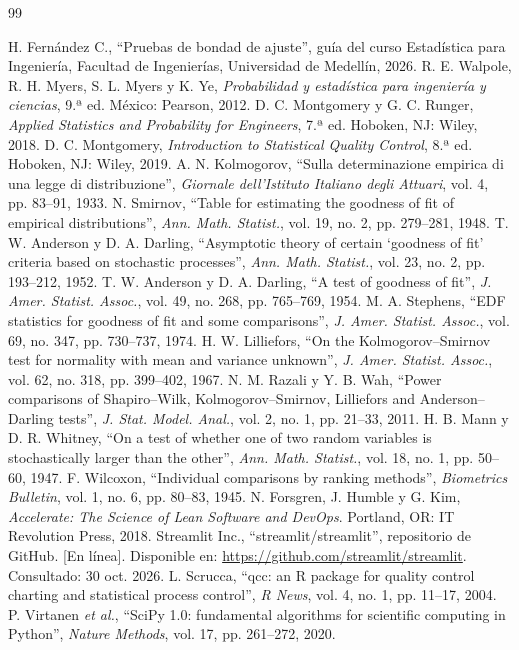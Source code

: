 \documentclass[11pt]{article}
\begin{document}
\begin{thebibliography}{99}\small
{}
 H. Fernández C., ``Pruebas de bondad de ajuste'', guía del curso Estadística para Ingeniería,
Facultad de Ingenierías, Universidad de Medellín, 2026.
 R. E. Walpole, R. H. Myers, S. L. Myers y K. Ye, \emph{Probabilidad y estadística para
ingeniería y ciencias}, 9.ª ed. México: Pearson, 2012.
 D. C. Montgomery y G. C. Runger, \emph{Applied Statistics and Probability for Engineers},
7.ª ed. Hoboken, NJ: Wiley, 2018.
 D. C. Montgomery, \emph{Introduction to Statistical Quality Control}, 8.ª ed. Hoboken, NJ:
Wiley, 2019.
 A. N. Kolmogorov, ``Sulla determinazione empirica di una legge di distribuzione'',
\emph{Giornale dell'Istituto Italiano degli Attuari}, vol. 4, pp. 83--91, 1933.
 N. Smirnov, ``Table for estimating the goodness of fit of empirical distributions'', \emph{Ann.
Math. Statist.}, vol. 19, no. 2, pp. 279--281, 1948.
 T. W. Anderson y D. A. Darling, ``Asymptotic theory of certain `goodness of fit' criteria based on
stochastic processes'', \emph{Ann. Math. Statist.}, vol. 23, no. 2, pp. 193--212, 1952.
 T. W. Anderson y D. A. Darling, ``A test of goodness of fit'', \emph{J. Amer. Statist. Assoc.},
vol. 49, no. 268, pp. 765--769, 1954.
 M. A. Stephens, ``EDF statistics for goodness of fit and some comparisons'', \emph{J. Amer.
Statist. Assoc.}, vol. 69, no. 347, pp. 730--737, 1974.
 H. W. Lilliefors, ``On the Kolmogorov--Smirnov test for normality with mean and variance
unknown'', \emph{J. Amer. Statist. Assoc.}, vol. 62, no. 318, pp. 399--402, 1967.
 N. M. Razali y Y. B. Wah, ``Power comparisons of Shapiro--Wilk, Kolmogorov--Smirnov, Lilliefors
and Anderson--Darling tests'', \emph{J. Stat. Model. Anal.}, vol. 2, no. 1, pp. 21--33, 2011.
 H. B. Mann y D. R. Whitney, ``On a test of whether one of two random variables is
stochastically larger than the other'', \emph{Ann. Math. Statist.}, vol. 18, no. 1, pp. 50--60, 1947.
 F. Wilcoxon, ``Individual comparisons by ranking methods'', \emph{Biometrics Bulletin}, vol. 1,
no. 6, pp. 80--83, 1945.
 N. Forsgren, J. Humble y G. Kim, \emph{Accelerate: The Science of Lean Software and DevOps}.
Portland, OR: IT Revolution Press, 2018.
 Streamlit Inc., ``streamlit/streamlit'', repositorio de GitHub. [En línea]. Disponible en:
\url{https://github.com/streamlit/streamlit}. Consultado: 30 oct. 2026.
 L. Scrucca, ``qcc: an R package for quality control charting and statistical process control'',
\emph{R News}, vol. 4, no. 1, pp. 11--17, 2004.
 P. Virtanen \emph{et al.}, ``SciPy 1.0: fundamental algorithms for scientific computing in
Python'', \emph{Nature Methods}, vol. 17, pp. 261--272, 2020.
\end{thebibliography}
\end{document}
